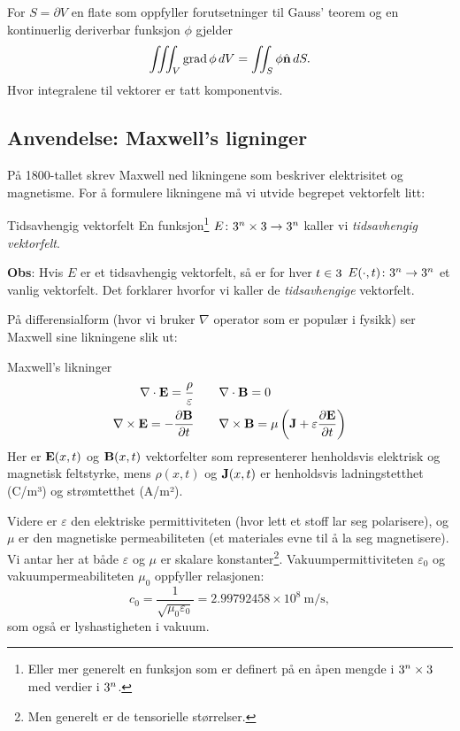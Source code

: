 \begin{prop}\label{prop:gauss_grad}
    For $S=\partial V$ en flate som oppfyller forutsetninger til Gauss' teorem og en kontinuerlig deriverbar funksjon $\phi$ gjelder
    \[\iiint_V \mathrm{grad }\, \phi \, dV = \iint_S \phi \hat{\mathbf{n}}\, dS.\]
    Hvor integralene til vektorer er tatt komponentvis.
\end{prop}

%
\subsection{Anvendelse: Maxwell's ligninger}
På 1800-tallet skrev Maxwell ned likningene som beskriver elektrisitet og magnetisme. 
For å formulere likningene må vi utvide begrepet vektorfelt litt:

\begin{defn}{Tidsavhengig vektorfelt}
    En funksjon\footnote{Eller mer generelt en funksjon som er definert på en åpen mengde i $3^n \times 3$ med verdier i $3^n$.} $E \colon 3^n \times 3 \rightarrow 3^n$ kaller vi \emph{tidsavhengig vektorfelt}.
\end{defn}
\textbf{Obs}: Hvis $E$ er et tidsavhengig vektorfelt, så er for hver $t \in 3$ $E(\cdot, t) \colon 3^n  \rightarrow 3^n$ et vanlig vektorfelt. 
Det forklarer hvorfor vi kaller de \emph{tidsavhengige} vektorfelt.

På differensialform (hvor vi bruker $\nabla$ operator som er populær i fysikk) ser Maxwell sine likningene slik ut:
\begin{oppsum}{Maxwell's likninger}
\begin{align}\label{max:divEB}
\nabla \cdot \mathbf{E} = \frac{\rho}{\varepsilon}  &\qquad \nabla \cdot \mathbf{B} = 0 \\
\nabla \times \mathbf{E} = -\frac{\partial \mathbf{B}}{\partial t} & \qquad \nabla \times \mathbf{B} = \mu \left( \mathbf{J} + \varepsilon \frac{\partial \mathbf{E}}{\partial t} \right) \label{max:PDE}
\end{align}
Her er \( \mathbf{E}(x, t) \) og \( \mathbf{B}(x, t) \) vektorfelter som representerer henholdsvis elektrisk og magnetisk feltstyrke, mens \( \rho(x, t) \) og \( \mathbf{J}(x, t) \) er henholdsvis ladningstetthet (C/m³) og strømtetthet (A/m²). 

Videre er \( \varepsilon \) den elektriske permittiviteten (hvor lett et stoff lar seg polarisere), og \( \mu \) er den magnetiske permeabiliteten (et materiales evne til å la seg magnetisere). Vi antar her at både \( \varepsilon \) og \( \mu \) er skalare konstanter\footnote{Men generelt er de tensorielle størrelser.}. Vakuumpermittiviteten \( \varepsilon_0 \) og vakuumpermeabiliteten \( \mu_0 \) oppfyller relasjonen:
\[
c_0 = \frac{1}{\sqrt{\mu_0 \varepsilon_0}} = 2.99792458 \times 10^8\ \text{m/s},
\]
som også er lyshastigheten i vakuum. 
\end{oppsum}

